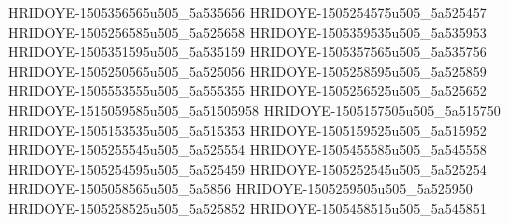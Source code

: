 HRIDOYE-1505356565u505_5a535656
HRIDOYE-1505254575u505_5a525457
HRIDOYE-1505256585u505_5a525658
HRIDOYE-1505359535u505_5a535953
HRIDOYE-1505351595u505_5a535159
HRIDOYE-1505357565u505_5a535756
HRIDOYE-1505250565u505_5a525056
HRIDOYE-1505258595u505_5a525859
HRIDOYE-1505553555u505_5a555355
HRIDOYE-1505256525u505_5a525652
HRIDOYE-1515059585u505_5a51505958
HRIDOYE-1505157505u505_5a515750
HRIDOYE-1505153535u505_5a515353
HRIDOYE-1505159525u505_5a515952
HRIDOYE-1505255545u505_5a525554
HRIDOYE-1505455585u505_5a545558
HRIDOYE-1505254595u505_5a525459
HRIDOYE-1505252545u505_5a525254
HRIDOYE-1505058565u505_5a5856
HRIDOYE-1505259505u505_5a525950
HRIDOYE-1505258525u505_5a525852
HRIDOYE-1505458515u505_5a545851
